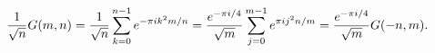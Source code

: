 \[\frac{1}{\sqrt{n}}G(m,n)=\frac{1}{\sqrt{n}}\sum\limits_{k=0}^{n-1}e^{-\pi ik^{%
2}m/n}=\frac{e^{-\pi i/4}}{\sqrt{m}}\sum\limits_{j=0}^{m-1}e^{\pi ij^{2}n/m}=%
\frac{e^{-\pi i/4}}{\sqrt{m}}G(-n,m).\]